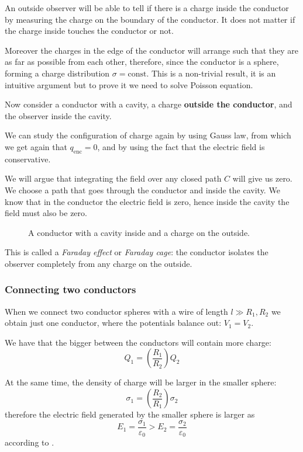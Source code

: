\documentclass[12pt]{extarticle}
\begin{document}
An outside observer will be able to tell if there is a charge inside the conductor by measuring the charge on the boundary of the conductor.
It does not matter if the charge inside touches the conductor or not.

Moreover the charges in the edge of the conductor will arrange such that they are as far as possible from each other, therefore, since the conductor is a sphere, forming a charge distribution $\sigma = \text{const}$.
This is a non-trivial result, it is an intuitive argument but to prove it we need to solve Poisson equation.

Now consider a conductor with a cavity, a charge \textbf{outside the conductor}, and the observer inside the cavity.

We can study the configuration of charge again by using Gauss law, from which we get again that $q_\text{enc} = 0$, and by using the fact that the electric field is conservative.

We will argue that integrating the field over any closed path $C$ will give us zero.
We choose a path that goes through the conductor and inside the cavity.
We know that in the conductor the electric field is zero, hence inside the cavity the field must also be zero.

\begin{figure}[H]
	\centering
	
	\caption{A conductor with a cavity inside and a charge on the outside.}
\end{figure}

This is called a \emph{Faraday effect} or \emph{Faraday cage}: the conductor isolates the observer completely from any charge on the outside.


\subsubsection{Connecting two conductors}

When we connect two conductor spheres with a wire of length $l \gg R_1, R_2$ we obtain just one conductor, where the potentials balance out: $V_1 = V_2$.

We have that the bigger between the conductors will contain more charge:
\begin{equation}
	Q_1 = \left(\frac{R_1}{R_2}\right) Q_2
\end{equation}

At the same time, the density of charge will be larger in the smaller sphere:
\begin{equation}
	\sigma_1 =  \left(\frac{R_2}{R_1}\right) \sigma_2
\end{equation}
therefore the electric field generated by the smaller sphere is larger as
\begin{equation}
	E_1 = \frac{\sigma_1}{\varepsilon_0} > E_2 = \frac{\sigma_2}{\varepsilon_0}
\end{equation}
according to .
\end{document}
